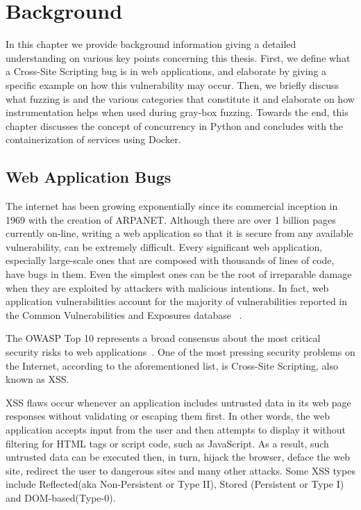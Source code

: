 \chapter{Background}
\label{sec:background}
\minitoc
\vspace*{1cm}

In this chapter we provide background information giving a detailed understanding on various key points concerning this thesis. First, we define what a Cross-Site Scripting bug is in web applications, and elaborate by giving a specific example on how this vulnerability may occur. Then, we briefly discuss what fuzzing is and the various categories that constitute it and elaborate on how instrumentation helps when used during gray-box fuzzing. Towards the end, this chapter discusses the concept of concurrency in Python and concludes with the containerization of services using Docker.

\section{Web Application Bugs}
The internet has been growing exponentially since its commercial inception in 1969 with the creation of ARPANET. Although there are over 1 billion pages currently on-line, writing a web application so that it is secure from any available vulnerability, can be extremely difficult. Every significant web application, especially large-scale ones that are composed with thousands of lines of code, have bugs in them. Even the simplest ones can be the root of irreparable damage when they are exploited by attackers with malicious intentions. In fact, web application vulnerabilities account for the majority of vulnerabilities reported in the Common Vulnerabilities and Exposures database ~\cite{cve}. 

The OWASP Top 10 represents a broad consensus about the most critical security risks to web applications~\cite{owasp2017}. One of the most pressing security problems on the Internet, according to the aforementioned list, is Cross-Site Scripting, also known as XSS.

XSS flaws occur whenever an application includes untrusted data in its web page responses without validating or escaping them first. In other words, the web application accepts input from the user and then attempts to display it without filtering for HTML tags or script code, such as JavaScript. As a result, such untrusted data can be executed then, in turn, hijack the browser, deface the web site, redirect the user to dangerous sites and many other attacks. Some XSS types include Reflected(aka Non-Persistent or Type II), Stored (Persistent or Type I) and DOM-based(Type-0).

